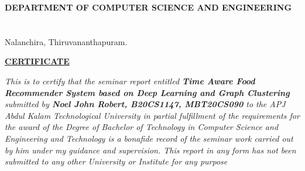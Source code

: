 
\setlength{\headsep}{0.4in}
\begin{center}

{\sf \textbf{\textcolor[rgb]{0,0,0}{DEPARTMENT OF COMPUTER SCIENCE AND ENGINEERING}}}\\[0.5ex]
{}\\[0.4ex]
{}\\[0.4ex]
Nalanchira, Thiruvananthapuram.



\end{center}


\vspace{0.15cm}
 \begin{figure}[!h]
 \begin{center}
 \end{center}
 \end{figure}
\vspace{0.02cm}

\begin{center}
\textcolor[rgb]{0,0,0}{\textbf{\underline{CERTIFICATE}}} \\[1ex]
\end{center}
\par
\emph{
\textit{{This is to certify that the seminar report entitled \textbf{Time Aware Food Recommender System based on Deep Learning and Graph Clustering}  submitted by \textbf{Noel John Robert, B20CS1147, MBT20CS090} to the APJ Abdul Kalam Technological University in partial fulfillment of the requirements for the award of the Degree of {Bachelor of Technology} in {Computer Science and Engineering and Technology} is a bonafide record of the seminar work carried out by him under my guidance and supervision. This report in any form has not been submitted to any other University or Institute for any purpose}}} 



\vspace{1.0 cm}
\vspace{1.5 cm}
\vspace{1.0 cm}
\vspace{1.5 cm}


